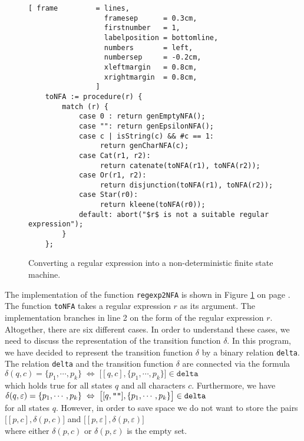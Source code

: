 \begin{figure}[!ht]
\centering
\begin{Verbatim}[ frame         = lines, 
                  framesep      = 0.3cm, 
                  firstnumber   = 1,
                  labelposition = bottomline,
                  numbers       = left,
                  numbersep     = -0.2cm,
                  xleftmargin   = 0.8cm,
                  xrightmargin  = 0.8cm,
                ]
    toNFA := procedure(r) {
        match (r) {
            case 0 : return genEmptyNFA();
            case "": return genEpsilonNFA();
            case c | isString(c) && #c == 1: 
                 return genCharNFA(c);
            case Cat(r1, r2): 
                 return catenate(toNFA(r1), toNFA(r2));
            case Or(r1, r2): 
                 return disjunction(toNFA(r1), toNFA(r2));
            case Star(r0): 
                 return kleene(toNFA(r0));
            default: abort("$r$ is not a suitable regular expression");
        }
    };    
\end{Verbatim} 
\vspace*{-0.3cm}
\caption{Converting a regular expression into a non-deterministic finite state machine.}
\label{fig:regexp-2-nfa.stlx:toNFA}
\end{figure}


The implementation of the function \texttt{regexp2NFA} is shown in
Figure \ref{fig:regexp-2-nfa.stlx:toNFA} on page \pageref{fig:regexp-2-nfa.stlx:toNFA}.
The function \texttt{toNFA} takes a regular expression $r$ as its argument.  
The implementation branches in line 2 on the form of the regular
expression $r$.  Altogether, there are six different cases.  In order to understand these cases, we
need to discuss the representation of the transition function $\delta$.  In this program, we have
decided to represent the transition function $\delta$ by a binary relation \texttt{delta}.
The relation \texttt{delta} and the transition function  $\delta$ are connected via the formula
\\[0.2cm]
\hspace*{1.3cm}
$\delta(q, c) = \{ p_1, \cdots, p_k \} \;\Leftrightarrow\; \bigl[ [q,c], \{ p_1, \cdots, p_k \} \bigr] \in \mathtt{delta}$
\\[0.2cm]
which holds true for all states $q$ and all characters $c$.  Furthermore, we have
\\[0.2cm]
\hspace*{1.3cm}
$\delta(q, \varepsilon) = \{ p_1, \cdots, p_k \} \;\Leftrightarrow\; \bigl[ [q,\texttt{\symbol{34}\symbol{34}}], \{ p_1, \cdots, p_k \} \bigr] \in \mathtt{delta}$
\\[0.2cm]
for all states $q$.  However, in order to save space we do not want to store the pairs
\\[0.2cm]
\hspace*{1.3cm}
$\bigl[ [p, c], \delta(p,c) \bigr]$ \quad and \quad $\bigl[ [p, \varepsilon], \delta(p,\varepsilon) \bigr]$
\\[0.2cm]
where either $\delta(p,c)$ or $\delta(p,\varepsilon)$ is the empty set.


